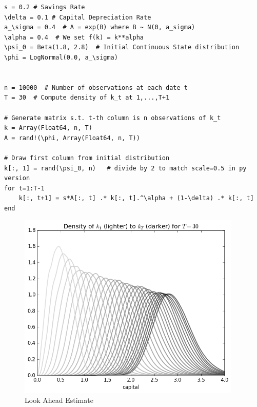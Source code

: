 \documentclass[a4paper,12pt]{article}
\theoremstyle{definition}
\begin{document}
\begin{lstlisting}
s = 0.2 # Savings Rate
\delta = 0.1 # Capital Depreciation Rate
a_\sigma = 0.4  # A = exp(B) where B ~ N(0, a_sigma)
\alpha = 0.4  # We set f(k) = k**alpha
\psi_0 = Beta(1.8, 2.8)  # Initial Continuous State distribution
\phi = LogNormal(0.0, a_\sigma)


n = 10000  # Number of observations at each date t
T = 30  # Compute density of k_t at 1,...,T+1

# Generate matrix s.t. t-th column is n observations of k_t
k = Array(Float64, n, T)
A = rand!(\phi, Array(Float64, n, T))

# Draw first column from initial distribution
k[:, 1] = rand(\psi_0, n)   # divide by 2 to match scale=0.5 in py version
for t=1:T-1
    k[:, t+1] = s*A[:, t] .* k[:, t].^\alpha + (1-\delta) .* k[:, t]
end
\end{lstlisting}

\begin{figure}[h]
\caption{Look Ahead Estimate}
\label{fig:LAEConvergence1}
\includegraphics[width=0.95\textwidth]{CMCConvergence1.png} 
\centering
\end{figure}
\end{document}
